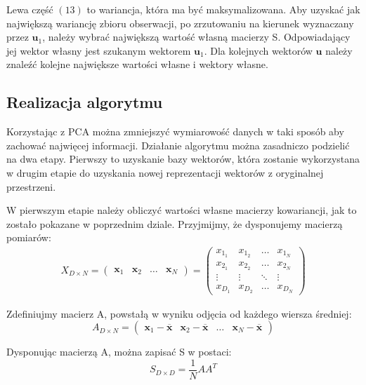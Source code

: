 \documentclass[oneside, eng]{mgr}
\newcommand{\bb}{\textbf}
\begin{document}
Lewa część $(13)$ to wariancja, która ma być maksymalizowana. Aby uzyskać jak największą wariancję zbioru obserwacji, po zrzutowaniu na kierunek wyznaczany przez $\bb{u}_1$, należy wybrać największą wartość własną macierzy S. Odpowiadający jej wektor własny jest szukanym wektorem $\bb{u}_1$. Dla kolejnych wektorów $\bb{u}$ należy znaleźć kolejne największe wartości własne i wektory własne.

\subsection{Realizacja algorytmu}  \label{Realizacja algorytmu}
Korzystając z PCA można zmniejszyć wymiarowość danych w taki sposób aby zachować najwięcej informacji. Działanie algorytmu można zasadniczo podzielić na dwa etapy. Pierwszy to uzyskanie bazy wektorów, która zostanie wykorzystana w drugim etapie do uzyskania nowej reprezentacji wektorów z oryginalnej przestrzeni.

W pierwszym etapie należy obliczyć wartości własne macierzy kowariancji, jak to zostało pokazane w poprzednim dziale. Przyjmijmy, że dysponujemy macierzą pomiarów:
\begin{align}
	X_{D \times N} = 
	\left( \begin{array}{llll}
		\bb{x}_1 & \bb{x}_2 & \ldots & \bb{x}_N
	\end{array} \right)	
	=
	\left( \begin{array}{llll}
		x_{1_1} & x_{1_2} & \ldots & x_{1_N} \\
		x_{2_1} & x_{2_2} & \ldots & x_{2_N} \\
		\vdots  & \vdots  & \ddots & \vdots  \\
		x_{D_1} & x_{D_2} & \ldots & x_{D_N}
	\end{array} \right)
\end{align}

Zdefiniujmy macierz A, powstałą w wyniku odjęcia od każdego wiersza średniej:
\begin{equation}
	A_{D \times N} = 
	\left( \begin{array}{llll}
	\bb{x}_1 - \overline{\bb{x}} & \bb{x}_2 - \overline{\bb{x}} & \ldots & \bb{x}_N - \overline{\bb{x}}
	\end{array} \right)
\end{equation}


Dysponując macierzą A, można zapisać S w postaci:
\begin{equation}
	S_{D \times D} = \frac{1}{N} A A^T
\end{equation}
\end{document}
